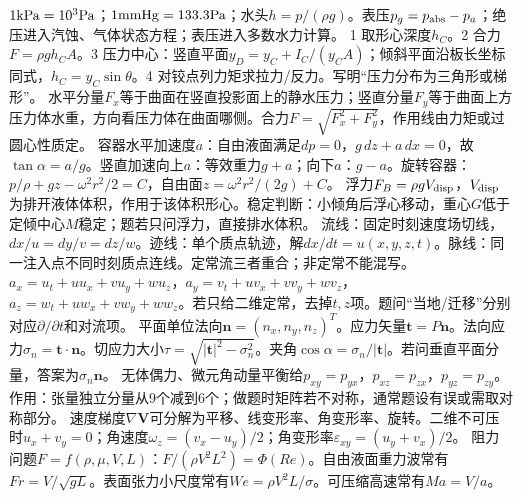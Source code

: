 $1{\rm kPa}=10^3{\rm Pa}$；$1{\rm mmHg}=133.3{\rm Pa}$；水头$h=p/(\rho g)$。表压$p_g=p_{\rm abs}-p_a$；绝压进入汽蚀、气体状态方程；表压进入多数水力计算。
1 取形心深度$h_C$。2 合力$F=\rho gh_CA$。3 压力中心：竖直平面$y_D=y_C+I_C/(y_CA)$；倾斜平面沿板长坐标同式，$h_C=y_C\sin\theta$。4 对铰点列力矩求拉力/反力。写明“压力分布为三角形或梯形”。
水平分量$F_x$等于曲面在竖直投影面上的静水压力；竖直分量$F_y$等于曲面上方压力体水重，方向看压力体在曲面哪侧。合力$F=\sqrt{F_x^2+F_y^2}$，作用线由力矩或过圆心性质定。
容器水平加速度$a$：自由液面满足$dp=0$，$g\,dz+a\,dx=0$，故$\tan\alpha=a/g$。竖直加速向上$a$：等效重力$g+a$；向下$a$：$g-a$。旋转容器：$p/\rho+gz-\omega^2r^2/2=C$，自由面$z=\omega^2r^2/(2g)+C$。
浮力$F_B=\rho gV_{\rm disp}$，$V_{\rm disp}$为排开液体体积，作用于该体积形心。稳定判断：小倾角后浮心移动，重心$G$低于定倾中心$M$稳定；题若只问浮力，直接排水体积。
流线：固定时刻速度场切线，$dx/u=dy/v=dz/w$。迹线：单个质点轨迹，解$dx/dt=u(x,y,z,t)$。脉线：同一注入点不同时刻质点连线。定常流三者重合；非定常不能混写。
$a_x=u_t+uu_x+vu_y+wu_z$，$a_y=v_t+uv_x+vv_y+wv_z$，$a_z=w_t+uw_x+vw_y+ww_z$。若只给二维定常，去掉$t,z$项。题问“当地/迁移”分别对应$\partial/\partial t$和对流项。
平面单位法向$\bm n=(n_x,n_y,n_z)^T$。应力矢量$\bm t=P\bm n$。法向应力$\sigma_n=\bm t\cdot\bm n$。切应力大小$\tau=\sqrt{|\bm t|^2-\sigma_n^2}$。夹角$\cos\alpha=\sigma_n/|\bm t|$。若问垂直平面分量，答案为$\sigma_n\bm n$。
无体偶力、微元角动量平衡给$p_{xy}=p_{yx}$，$p_{xz}=p_{zx}$，$p_{yz}=p_{zy}$。作用：张量独立分量从9个减到6个；做题时矩阵若不对称，通常题设有误或需取对称部分。
速度梯度$\nabla\bm V$可分解为平移、线变形率、角变形率、旋转。二维不可压时$u_x+v_y=0$；角速度$\omega_z=(v_x-u_y)/2$；角变形率$\varepsilon_{xy}=(u_y+v_x)/2$。
阻力问题$F=f(\rho,\mu,V,L)$：$F/(\rho V^2L^2)=\Phi(Re)$。自由液面重力波常有$Fr=V/\sqrt{gL}$。表面张力小尺度常有$We=\rho V^2L/\sigma$。可压缩高速常有$Ma=V/a$。

